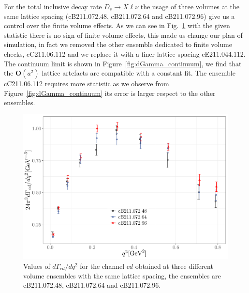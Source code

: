 \documentclass [a4paper, 11pt]{article}
\begin{document}
For the total inclusive decay rate $D_s \to X\ell\nu$ the usage of three volumes
at the same lattice spacing (cB211.072.48, cB211.072.64 and cB211.072.96)
give us a control over the finite volume effects. As we can see in Fig.~\ref{fig:dGamma_FSE_B}
with the given statistic there is no sign of finite volume effects, this made us
change our plan of simulation, in fact we removed the other ensemble dedicated to
finite volume checks, cC211.06.112 and we replace it with a finer lattice spacing
cE211.044.112.
The continuum limit is shown in Figure~\ref{fig:dGamma_continuum}, we find that the
$\mathbf{O}(a^2)$ lattice artefacts are compatible with a constant fit. The ensemble cC211.06.112 requires more statistic as we observe from Figure~\ref{fig:dGamma_continuum} its error is larger respect to the other ensembles.

\begin{figure}
	\begin{center}
		\includegraphics[scale=0.7]{figures/dGamma_FSE_B.pdf}
		\caption{Values of $d\Gamma_{cd}/dq^2 $ for the channel $cd$ obtained at three different volume
			ensembles with the same lattice spacing, the ensembles are cB211.072.48, cB211.072.64 and cB211.072.96.}
		\label{fig:dGamma_FSE_B}
	\end{center}
\end{figure}
\end{document}
